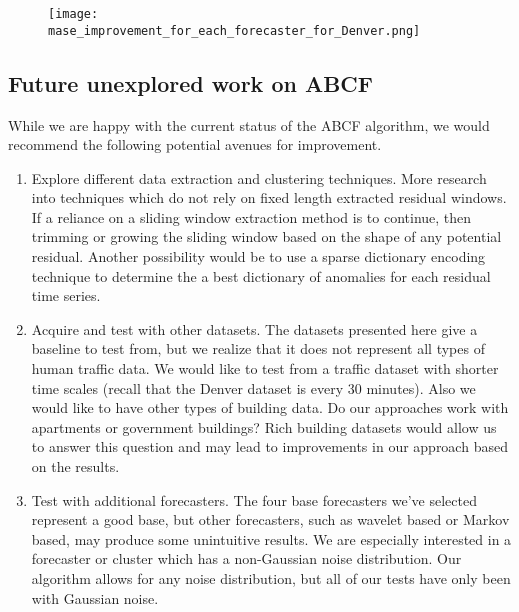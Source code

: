 \begin{figure}[!h]
	\begin{center}
		\texttt{[image: mase\_improvement\_for\_each\_forecaster\_for\_Denver.png]}
	\end{center}
	\caption{}
	\label{fig:mase_improve_denver}
\end{figure}

\newpage


\subsection{Future unexplored work on ABCF}
While we are happy with the current status of the ABCF algorithm, we would recommend the following potential avenues for improvement.

\begin{enumerate}
	\item Explore different data extraction and clustering techniques.  More research into techniques which do not rely on fixed length extracted residual windows.  If a reliance on a sliding window extraction method is to continue, then trimming or growing the sliding window based on the shape of any potential residual.  Another possibility would be to use a sparse dictionary encoding technique to determine the a best dictionary of anomalies for each residual time series.
	
	\item Acquire and test with other datasets.  The datasets presented here give a baseline to test from, but we realize that it does not represent all types of human traffic data.  We would like to test from a traffic dataset with shorter time scales (recall that the Denver dataset is every 30 minutes).  Also we would like to have other types of building data.  Do our approaches work with apartments or government buildings?  Rich building datasets would allow us to answer this question and may lead to improvements in our approach based on the results.
	
	\item Test with additional forecasters.  The four base forecasters we've selected represent a good base, but other forecasters, such as wavelet based or Markov based, may produce some unintuitive results.  We are especially interested in a forecaster or cluster which has a non-Gaussian noise distribution.  Our algorithm allows for any noise distribution, but all of our tests have only been with Gaussian noise.
\end{enumerate}

